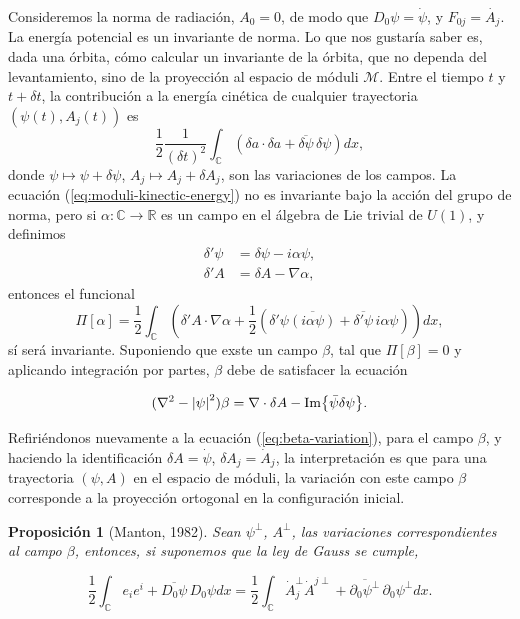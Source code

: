 \documentclass[spanish]{amsart}
\newtheorem{proposition}{Proposición}
\newcommand*{\R}{\mathbb{R}}
\newcommand*{\C}{\mathbb{C}}
\newcommand*{\del}{\partial}
\newcommand*{\moduli}{\mathcal{M}}
\begin{document}
Consideremos la norma de radiación, \(A_0 = 0 \), de modo que
\(D_0\psi = \dot{\psi}\), y \(F_{0j} = \dot{A_j} \). La energía
potencial es un invariante de norma. Lo que nos gustaría saber es,
dada una órbita, cómo calcular un invariante de la órbita, que no
dependa del levantamiento, sino de la proyección al espacio de móduli
\(\moduli \). Entre el tiempo \(t \) y \(t + \delta t \), la
contribución a la energía cinética de cualquier trayectoria \((\psi(t),
A_j(t)) \) es
\begin{equation}
  \label{eq:moduli-kinectic-energy}
\frac{1}{2} \frac{1}{(\delta t)^2}\int_{\C} \left( \delta a \cdot
  \delta a + \overline{\delta \psi}\,\delta\psi \right) dx,
\end{equation}
donde \(\psi \mapsto \psi + \delta\psi \), \(A_j \mapsto A_j + \delta
A_j \), son las variaciones de los campos. La ecuación
(\ref{eq:moduli-kinectic-energy}) no es invariante bajo la acción del
grupo de norma, pero si \(\alpha: \C \to \R \) es un campo en el
álgebra de Lie trivial de \(U(1) \), y definimos
\begin{equation}
  \label{eq:beta-variation}
  \begin{split}
  \delta'\psi &= \delta \psi - i\alpha\psi, \\
  \delta' A &= \delta A - \nabla \alpha,    
  \end{split}
\end{equation}
entonces el funcional
\begin{equation}
\label{eq:moduli-invariant-kinectic-energy}
\Pi[\alpha] = \frac{1}{2} \int_{\C} \left( \delta' A \cdot \nabla\alpha +
  \frac{1}{2} \left( \delta'\psi \overline{(i\alpha\psi)} +
    \overline{\delta'\psi}\, i\alpha\psi\right) \right) dx,
\end{equation}
sí será invariante. Suponiendo que exste un campo \(\beta \), tal que
\(\Pi[\beta] = 0 \) y aplicando integración por partes, \(\beta \)
debe de satisfacer la ecuación

\[
(\laplacian - \abs{\psi}^2)\beta = \nabla\cdot \delta A -
\Im{\bar{\psi}\delta \psi}.
\]

Refiriéndonos nuevamente a la ecuación (\ref{eq:beta-variation}), para
el campo \(\beta \), y haciendo la identificación \(\delta A =
\dot{\psi} \), \(\delta A_j = \dot{A}_j \), la interpretación es que
para una trayectoria \((\psi, A) \) en el espacio de móduli, la
variación con este campo \(\beta \) corresponde a la proyección
ortogonal en la configuración inicial.

\begin{proposition}
  [Manton, 1982] Sean \(\psi^{\perp} \), \(A^{\perp} \), las variaciones
  correspondientes al campo \(\beta \), entonces, si suponemos que la
  ley de Gauss se cumple,
  
\begin{equation}
\label{eq:energy-variation-correspondence}
\frac{1}{2} \int_{\C}e_ie^i + \overline{D_0\psi}\,D_0\psi dx =
\frac{1}{2} \int_{\C}\dot{A}_j^{\perp}\dot{A}^{j\perp} +
\overline{\del_0\psi^{\perp}}\,\del_0\psi^{\perp} dx.
\end{equation}
\end{proposition}
\end{document}
